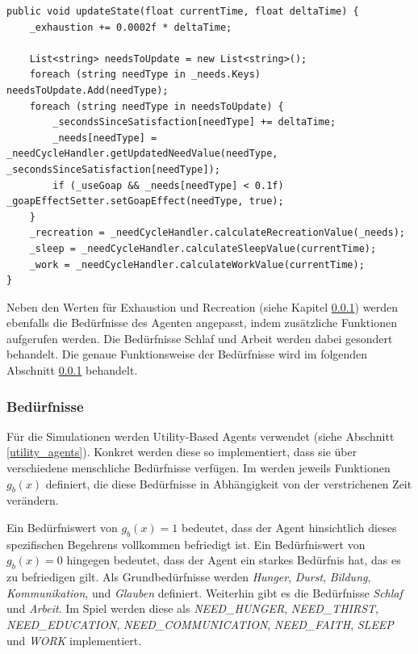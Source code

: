 \begin{minipage}{\linewidth}
\begin{lstlisting}[linewidth=16.4cm, label=lst:npcstate_updatestate, caption=Funktion \inlinecode{updateState} in \inlinecode{NpcState}, xleftmargin=1cm, basicstyle=\footnotesize]
public void updateState(float currentTime, float deltaTime) {
    _exhaustion += 0.0002f * deltaTime;

    List<string> needsToUpdate = new List<string>();
    foreach (string needType in _needs.Keys) needsToUpdate.Add(needType);
    foreach (string needType in needsToUpdate) {
        _secondsSinceSatisfaction[needType] += deltaTime;
        _needs[needType] = _needCycleHandler.getUpdatedNeedValue(needType, _secondsSinceSatisfaction[needType]);
        if (_useGoap && _needs[needType] < 0.1f) _goapEffectSetter.setGoapEffect(needType, true);
    }
    _recreation = _needCycleHandler.calculateRecreationValue(_needs);
    _sleep = _needCycleHandler.calculateSleepValue(currentTime);
    _work = _needCycleHandler.calculateWorkValue(currentTime);
}
\end{lstlisting}
\end{minipage}

Neben den Werten für Exhaustion und Recreation (siehe Kapitel \ref{npc_needs_architecture}) werden ebenfalls die Bedürfnisse des Agenten angepasst, indem zusätzliche Funktionen aufgerufen werden. Die Bedürfnisse Schlaf und Arbeit werden dabei gesondert behandelt. Die genaue Funktionsweise der Bedürfnisse wird im folgenden Abschnitt \ref{npc_needs_architecture} behandelt.


\subsubsection{Bedürfnisse}\label{npc_needs_architecture}
Für die Simulationen werden Utility-Based Agents verwendet (siehe Abschnitt \ref{utility_agents}). Konkret werden diese so implementiert, dass sie über verschiedene menschliche Bedürfnisse verfügen. Im  werden jeweils Funktionen $g_b(x)$ definiert, die diese Bedürfnisse in Abhängigkeit von der verstrichenen Zeit verändern.

Ein Bedürfniswert von $g_b(x) = 1$ bedeutet, dass der Agent hinsichtlich dieses spezifischen Begehrens vollkommen befriedigt ist. Ein Bedürfniswert von $g_b(x) = 0$ hingegen bedeutet, dass der Agent ein starkes Bedürfnis hat, das es zu befriedigen gilt.
Als Grundbedürfnisse werden \textit{Hunger}, \textit{Durst}, \textit{Bildung}, \textit{Kommunikation}, und \textit{Glauben} definiert. Weiterhin gibt es die Bedürfnisse \textit{Schlaf} und \textit{Arbeit}. Im Spiel werden diese als \textit{NEED\_HUNGER}, \textit{NEED\_THIRST}, \textit{NEED\_EDUCATION}, \textit{NEED\_COMMUNICATION}, \textit{NEED\_FAITH}, \textit{SLEEP} und \textit{WORK} implementiert.

